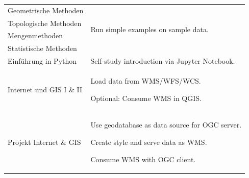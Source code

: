 \documentclass[11pt, a4paper, oneside, parskip=full-]{scrartcl}
\begin{document}
\begin{table}[!htbp]
\begin{tabularx}{\textwidth}{lX}
    Geometrische Methoden & \multirow[t]{4}{*}{Run simple examples on sample
    data.} \\
    \cmidrule(r){1-1} Topologische Methoden &  \\
    \cmidrule(r){1-1} Mengenmethoden &  \\
    \cmidrule(r){1-1} Statistische Methoden &  \\
    \midrule
    Einführung in Python & Self-study introduction via Jupyter Notebook. \\
    \midrule
    Internet und GIS I \& II &
      \begin{itemize}[left=0pt,nosep,before={\begin{minipage}[t]{\hsize}},after
      ={\end{minipage}}]
      \item Load data from WMS/WFS/WCS.
      \item Optional: Consume WMS in QGIS. \end{itemize}\nointerlineskip \\
    \midrule
    Projekt Internet \& GIS &
      \begin{itemize}[left=0pt,nosep,before={\begin{minipage}[t]{\hsize}},after
      ={\end{minipage}}]
      \item Use geodatabase as data source for OGC server.
      \item Create style and serve data as WMS.
      \item Consume WMS with OGC client. \end{itemize}\nointerlineskip \\
    \bottomrule
  \end{tabularx}%
\end{table}%

\end{document}
